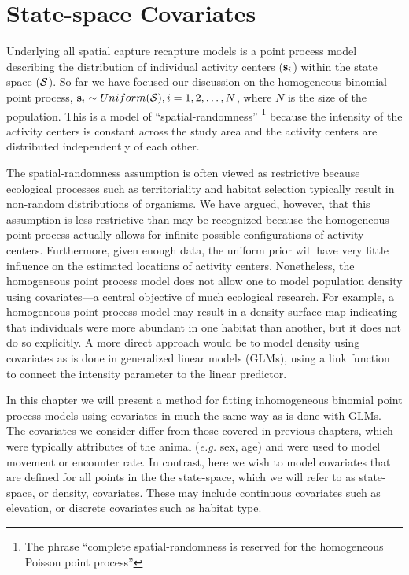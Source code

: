 


\chapter{State-space Covariates}
\label{chapt.state-space}

\vspace{0.3cm}

Underlying all spatial capture recapture models is a point process
model describing the distribution of individual activity
centers (${\bf s}_i$) within the state space ($\cal{S}$). So far we have focused our
discussion on the homogeneous binomial point process,
${\bf s}_i \sim Uniform({\cal S}), i=1,2,\dots,N$, where $N$ is the
size of the population. This is a model of
``spatial-randomness'' \footnote{The phrase ``complete
  spatial-randomness is reserved for the homogeneous Poisson point
  process''}
because the intensity of the
activity centers is constant across the study area and the activity
centers are distributed independently of each other.

The spatial-randomness assumption is often viewed as restrictive
because ecological processes such as
territoriality and habitat selection typically result in non-random
distributions of organisms. We have argued, however, that this
assumption is less restrictive than may be recognized because the
homogeneous point process actually allows for infinite
possible configurations of activity centers. Furthermore, given enough data,
the uniform prior will have very little influence on the estimated
locations of activity centers. Nonetheless, the homogeneous point
process model does not allow one to model population density using
covariates---a central objective of much ecological research.
For example, a homogeneous point process model
may result in a density surface map indicating that individuals were
more abundant in one habitat than another, but it does not do so
explicitly. A more direct approach would be to model density using
covariates as is done in generalized linear models (GLMs), using a
link function to connect the intensity parameter to the linear predictor.

In this chapter we will present a method
for fitting inhomogeneous binomial point process models using
covariates in much the same way as is done with GLMs. The
covariates we consider differ
from those covered in previous chapters, which were typically
attributes of the animal ({\it e.g.} sex, age) and were used to model movement or encounter
rate. In contrast, here we wish to
model covariates that are defined for all points in the
the state-space, which we will refer to as
state-space, or density, covariates. These may
include continuous covariates such as elevation, or discrete
covariates such as habitat type.

